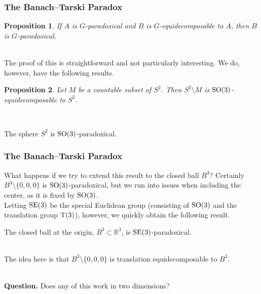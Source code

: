 \documentclass{beamer}
\newtheorem{proposition}{Proposition}
\begin{document}
\begin{frame}
\frametitle{The Banach--Tarski Paradox}
\begin{proposition}
If $A$ is $G$-paradoxical and $B$ is $G$-equidecomposable to $A$, then $B$ is $G$-paradoxical.
\end{proposition}
\noindent\\[0.5\baselineskip] The proof of this is straightforward and not particularly interesting. We do, however, have the following results.\\[0.5\baselineskip]
\begin{proposition}
Let $M$ be a countable subset of $S^2$. Then $S^2\setminus M$ is $\textup{SO}(3)$-equidecomposable to $S^2$.
\end{proposition}
\noindent\\[0.5\baselineskip]
\begin{corollary}
The sphere $S^2$ is $\textup{SO}(3)$-paradoxical.
\end{corollary}
\end{frame}

\begin{frame}
\frametitle{The Banach--Tarski Paradox}
What happens if we try to extend this result to the closed ball $B^3$? Certainly $B^3\setminus\{0, 0, 0\}$ is $\textup{SO}(3)$-paradoxical, but we run into issues when including the center, as it is fixed by $\textup{SO}(3)$.\\[0.5\baselineskip] %

Letting $\textup{SE}(3)$ be the special Euclidean group (consisting of $\textup{SO}(3)$ and the translation group $\textup{T}(3)$), however, we quickly obtain the following result.\\[0.5\baselineskip]
\begin{theorem}
The closed ball at the origin, $B^3 \subset \mathbb{R}^3$, is $\textup{SE}(3)$-paradoxical.
\end{theorem}
\noindent\\[0.5\baselineskip] The idea here is that $B^3\setminus\{0, 0, 0\}$ is translation equidecomposable to $B^3$.

\noindent\\[0.5\baselineskip] \textbf{Question.} Does any of this work in two dimensions?
\end{frame}

\end{document}
